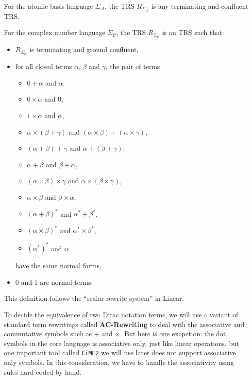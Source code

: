 \documentclass[manuscript, review, timestamp]{acmart}
\begin{document}
\begin{definition}
  For the atomic basis language $\Sigma_\mathcal{A}$, the TRS $R_{\Sigma_\mathcal{A}}$ is any terminating and confluent TRS.
\end{definition}


\begin{definition}
  For the complex number language $\Sigma_\mathcal{C}$, the TRS $R_{\Sigma_\mathcal{C}}$ is an TRS such that:
  \begin{itemize}
    \item $R_{\Sigma_\mathcal{C}}$ is terminating and ground confluent,
    \item for all closed terms $\alpha$, $\beta$ and $\gamma$, the pair of terms
    \begin{itemize}
        \item $0 + \alpha$ and $\alpha$,
        \item $0 \times \alpha$ and $0$,
        \item $1 \times \alpha$ and $\alpha$,
        \item $\alpha \times (\beta + \gamma)$ and $(\alpha \times \beta) + (\alpha \times \gamma)$,
        \item $(\alpha + \beta) + \gamma$ and $\alpha + (\beta + \gamma)$,
        \item $\alpha + \beta$ and $\beta + \alpha$,
        \item $(\alpha \times \beta) \times \gamma$ and $\alpha \times (\beta \times \gamma)$,
        \item $\alpha \times \beta$ and $\beta \times \alpha$,
        \item $(\alpha + \beta)^*$ and $\alpha^* + \beta^*$,
        \item $(\alpha \times \beta)^*$ and $\alpha^* \times \beta^*$,
        \item $(\alpha^*)^*$ and $\alpha$
    \end{itemize}
    have the same normal forms,
    \item $0$ and $1$ are normal terms.
  \end{itemize}  
\end{definition}

This definition follows the ``scalar rewrite system'' in Linear\cite{Arrighi2017}.


To decide the equivalence of two Dirac notation terms, we will use a variant of standard term rewritings called \textbf{AC-Rewriting} to deal with the associative and commutative symbols such as $+$ and $\times$. But here is one excpetion: the dot symbols in the core language is associative only, just like linear operations, but one important tool called \texttt{CiME2} we will use later does not support associative only symbols. In this consideration, we have to handle the associativity using rules hard-coded by hand.
\end{document}
